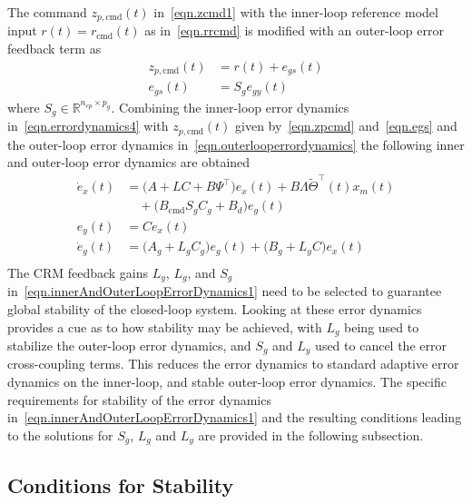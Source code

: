 \documentclass[journal]{IEEEtran}
\theoremstyle{innercustomthm}
\begin{document}
  The command $z_{p,\text{cmd}}(t)$ in\ \eqref{eqn.zcmd1} with the inner-loop reference model input $r(t)=r_{\text{cmd}}(t)$ as in\ \eqref{eqn.rrcmd} is modified with an outer-loop error feedback term as
  \begin{align}
    \label{eqn.zpcmd}
    z_{p,\text{cmd}}(t) &= r (t)+ e_{gs}(t) \\
    \label{eqn.egs}
    e_{gs}(t) &= S_{g}e_{gy}(t)
  \end{align}
  where $S_{g}\in\mathbb{R}^{n_{ep}\times p_{g}}$.
  Combining the inner-loop error dynamics in\ \eqref{eqn.errordynamics4} with $z_{p,\text{cmd}}(t)$ given by\ \eqref{eqn.zpcmd} and\ \eqref{eqn.egs} and the outer-loop error dynamics in\ \eqref{eqn.outerlooperrordynamics} the following inner and outer-loop error dynamics are obtained
  {%
    \small
    \begin{equation}
      \label{eqn.innerAndOuterLoopErrorDynamics1}
      \begin{split}
        \dot{e}_{x}(t)
        &=
        \bigr(A+LC+B\Psi^{\top}\bigr)e_{x}(t) + B\Lambda\widetilde{\Theta}^{\top}(t)x_{m}(t) \\
        & \quad + \bigr(B_{\text{cmd}}S_{g}C_{g} + B_{d}\bigr)e_{g}(t) \\
        e_{y}(t)
        &=
        Ce_{x}(t) \\
        \dot{e}_{g}(t)
        &=
        \bigr(A_{g} + L_{g}C_{g}\bigr)e_{g}(t) + \bigr(B_{g} + L_{y}C\bigr)e_{x}(t) \\
      \end{split}
    \end{equation}
  }%
  The CRM feedback gains $L_{y}$, $L_{g}$, and $S_{g}$ in\ \eqref{eqn.innerAndOuterLoopErrorDynamics1} need to be selected to guarantee global stability of the closed-loop system.
  Looking at these error dynamics provides a cue as to how stability may be achieved, with $L_{g}$ being used to stabilize the outer-loop error dynamics, and $S_{g}$ and $L_{y}$ used to cancel the error cross-coupling terms.
  This reduces the error dynamics to standard adaptive error dynamics on the inner-loop, and stable outer-loop error dynamics.
  The specific requirements for stability of the error dynamics in\ \eqref{eqn.innerAndOuterLoopErrorDynamics1} and the resulting conditions leading to the solutions for $S_{g}$, $L_{g}$ and $L_{y}$ are provided in the following subsection.

  \subsection{Conditions for Stability}
\end{document}
